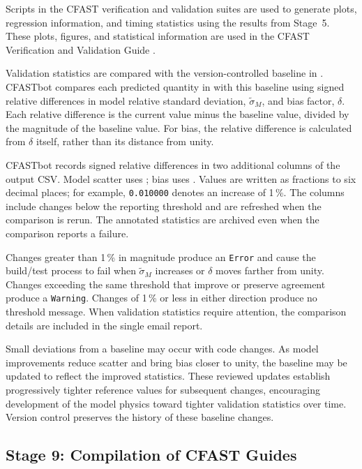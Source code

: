 \documentclass[12pt]{book}
\begin{document}
Scripts in the CFAST verification and validation suites are used to generate plots, regression information, and timing statistics using the results from Stage~5. These plots, figures, and statistical information are used in the CFAST Verification and Validation Guide \cite{CFAST_Valid_Guide_8}.

Validation statistics are compared with the version-controlled baseline in . CFASTbot compares each predicted quantity in  with this baseline using signed relative differences in model relative standard deviation, $\tilde{\sigma}_M$, and bias factor, $\delta$. Each relative difference is the current value minus the baseline value, divided by the magnitude of the baseline value. For bias, the relative difference is calculated from $\delta$ itself, rather than its distance from unity.

CFASTbot records signed relative differences in two additional columns of the output CSV. Model scatter uses ; bias uses . Values are written as fractions to six decimal places; for example, \texttt{0.010000} denotes an increase of 1\,\%. The columns include changes below the reporting threshold and are refreshed when the comparison is rerun. The annotated statistics are archived even when the comparison reports a failure.

Changes greater than 1\,\% in magnitude produce an \texttt{Error} and cause the build/test process to fail when $\tilde{\sigma}_M$ increases or $\delta$ moves farther from unity. Changes exceeding the same threshold that improve or preserve agreement produce a \texttt{Warning}. Changes of 1\,\% or less in either direction produce no threshold message. When validation statistics require attention, the comparison details are included in the single email report.

Small deviations from a baseline may occur with code changes. As model improvements reduce scatter and bring bias closer to unity, the baseline may be updated to reflect the improved statistics. These reviewed updates establish progressively tighter reference values for subsequent changes, encouraging development of the model physics toward tighter validation statistics over time. Version control preserves the history of these baseline changes.

\subsection*{Stage 9: Compilation of CFAST Guides}
\end{document}
